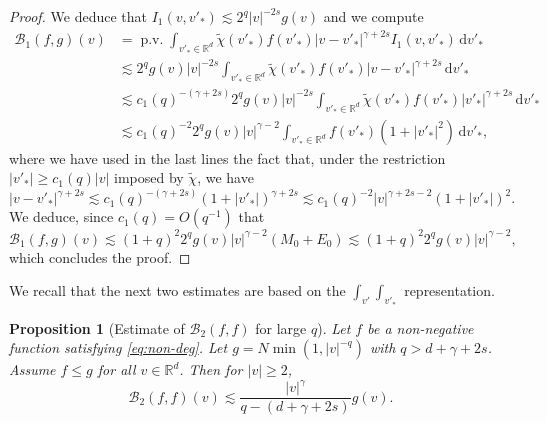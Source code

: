 \documentclass[JEP,XML,SOM,Unicode,NoFloatCountersInSection]{cedram}
\theoremstyle{plain}
\newtheorem{prop}[thm]{Proposition}
\theoremstyle{definition}
\numberwithin{equation}{section}
\newcommand{\R}{\mathbb R}
\newcommand{\dd} {\, \mathrm{d}}
\DeclareMathOperator{\PV}{p.v.}
\let\A N
\begin{document}
\begin{proof}
We deduce that $I_1(v,v'_*) \lesssim 2^q |v|^{-2s}g(v)$ and we compute
\begin{align*}
\mathcal{B}_1(f,g)(v) & = \PV \int_{v'_* \in \R^d} \tilde \chi(v'_*) f(v'_*) |v-v'_*|^{\gamma+2s} I_1(v,v'_*) \dd v'_* \\
& \lesssim 2^q g(v) |v|^{-2s} \int_{v'_* \in
\R^d} \tilde \chi(v'_*) f(v'_*)
|v-v'_*|^{\gamma+2s} \dd v'_* \\
& \lesssim c_1(q)^{-(\gamma+2s)} 2^q g(v) |v|^{-2s} \int_{v'_* \in
\R^d} \tilde \chi(v'_*) f(v'_*) |v'_*|^{\gamma+2s} \dd v'_* \\
& \lesssim c_1(q)^{-2} 2^q g(v) |v|^{\gamma-2} \int_{v'_* \in \R^d} f(v'_*) (1+|v'_*|^2) \dd v'_*,
\end{align*}
where we have used in the last lines the fact that, under the
restriction $|v'_*| \ge c_1(q) |v|$ imposed by $\tilde \chi$, we have
\[
|v-v'_*|^{\gamma+2s} \lesssim c_1(q)^{-(\gamma+2s)} (1+|v'_*|)^{\gamma+2s}
\lesssim c_1(q)^{-2} |v|^{\gamma+2s-2} (1+|v'_*|)^{2}.
\]
We deduce, since $c_1(q) = O(q^{-1})$ that
\begin{equation*}
\mathcal{B}_1(f,g)(v) \lesssim (1+q)^2 2^q g(v) |v|^{\gamma-2} (M_0 + E_0)
\lesssim (1+q)^2 2^q g(v) |v|^{\gamma-2},
\end{equation*}
which concludes the proof.
\end{proof}

We recall that the next two estimates are based on the $\int_{v'}
\int_{v'_*}$ representation.

\begin{prop}[Estimate of {$\mathcal{B}_2(f,f)$} for large
$q$] \label{prop:B2} Let $f$ be a non-negative function satisfying \eqref{eq:non-deg}. Let
$g = \A \min(1,|v|^{-q})$ with $q> d+ \gamma +2s$. Assume $f \leq g$ for all $v \in \R^d$. Then for
$|v| \ge 2$,
\[ \mathcal{B}_2 (f,f)(v)
\lesssim \frac{|v|^{\gamma}}{q-(d+\gamma + 2s)} g(v).\]
\end{prop}
\end{document}
